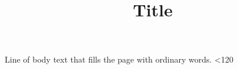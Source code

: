 \documentclass[11pt]{amsart}
\title{Title}
\begin{document}
\maketitle
\newcount\n {}
\loop Line of body text that fills the page with ordinary words. \advance{} \ifnum\n<120 \repeat
\par
\end{document}

